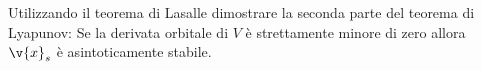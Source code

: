 \begin{ex}[]
    Utilizzando il teorema di Lasalle dimostrare la seconda parte del teorema di Lyapunov:
    Se la derivata orbitale di $V$ è strettamente minore di zero allora $\v{x}_s$ è asintoticamente stabile.
\end{ex}
\noindent
